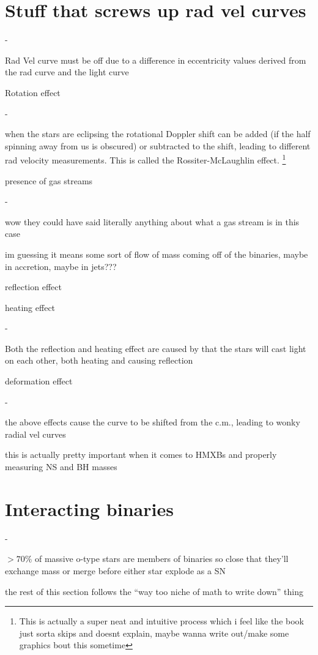\section{Stuff that screws up rad vel curves}
\begin{list}{-}{}
\item Rad Vel curve must be off due to a difference in eccentricity values derived from the rad curve and the light curve
\item Rotation effect
\begin{list}{-}{}
\item when the stars are eclipsing the rotational Doppler shift can be added (if the half spinning away from us is obscured) or subtracted to the shift, leading to different rad velocity measurements. This is called the Rossiter-McLaughlin effect. \footnote{This is actually a super neat and intuitive process which i feel like the book just sorta skips and doesnt explain, maybe wanna write out/make some graphics bout this sometime}
\end{list}
\item presence of gas streams
\begin{list}{-}{}
\item wow they could have said literally anything about what a gas stream is in this case
\item im guessing it means some sort of flow of mass coming off of the binaries, maybe in accretion, maybe in jets???
\end{list}
\item reflection effect
\item heating effect
\begin{list}{-}{}
\item Both the reflection and heating effect are caused by that the stars will cast light on each other, both heating and causing reflection
\end{list}
\item deformation effect
\begin{list}{-}{}
\item the above effects cause the curve to be shifted from the c.m., leading to wonky radial vel curves
\end{list}
\item  this is actually pretty important when it comes to HMXBs and properly measuring NS and BH masses
\end{list}


\section{Interacting binaries}
\begin{list}{-}{}
\item \(> 70\%\) of massive o-type stars are members of binaries so close that they'll exchange mass or merge before either star explode as a SN

\end{list}
the rest of this section follows the ``way too niche of math to write down'' thing


